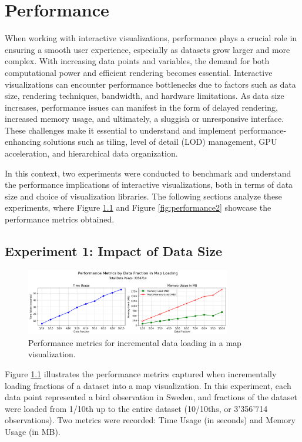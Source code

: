 \chapter{Performance}

When working with interactive visualizations, performance plays a crucial role in ensuring a smooth user experience, especially as datasets grow larger and more complex. With increasing data points and variables, the demand for both computational power and efficient rendering becomes essential. Interactive visualizations can encounter performance bottlenecks due to factors such as data size, rendering techniques, bandwidth, and hardware limitations. As data size increases, performance issues can manifest in the form of delayed rendering, increased memory usage, and ultimately, a sluggish or unresponsive interface. These challenges make it essential to understand and implement performance-enhancing solutions such as tiling, level of detail (LOD) management, GPU acceleration, and hierarchical data organization.

In this context, two experiments were conducted to benchmark and understand the performance implications of interactive visualizations, both in terms of data size and choice of visualization libraries. The following sections analyze these experiments, where Figure \ref{fig:performance1} and Figure \ref{fig:performance2} showcase the performance metrics obtained.

\section{Experiment 1: Impact of Data Size}

\begin{figure}[H]
    \centering
    \includegraphics[width=0.8\textwidth]{figures/map_performance.png}
    \caption{Performance metrics for incremental data loading in a map visualization.}
    \label{fig:performance1}
\end{figure}    

Figure \ref{fig:performance1} illustrates the performance metrics captured when incrementally loading fractions of a dataset into a map visualization. In this experiment, each data point represented a bird observation in Sweden, and fractions of the dataset were loaded from 1/10th up to the entire dataset (10/10ths, or 3'356'714 observations). Two metrics were recorded: Time Usage (in seconds) and Memory Usage (in MB).

